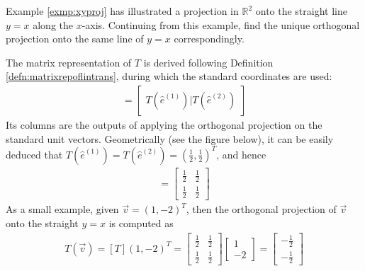 \begin{exmp}
Example \ref{exmp:xyproj} has illustrated a projection in $\mathbb{R}^2$ onto the straight line $y = x$ along the $x$-axis. Continuing from this example, find the unique orthogonal projection onto the same line of $y = x$ correspondingly.
\end{exmp}
\begin{solution}
The matrix representation of $T$ is derived following Definition \ref{defn:matrixrepoflintrans}, during which the standard coordinates are used:
\begin{align*}
[T] =
\begin{bmatrix}
T(\hat{e}^{(1)})|T(\hat{e}^{(2)})
\end{bmatrix}
\end{align*}
Its columns are the outputs of applying the orthogonal projection on the standard unit vectors. Geometrically (see the figure below), it can be easily deduced that $T(\hat{e}^{(1)}) = T(\hat{e}^{(2)}) = (\frac{1}{2}, \frac{1}{2})^T$, and hence
\begin{align*}
[T] =
\begin{bmatrix}
\frac{1}{2} & \frac{1}{2} \\
\frac{1}{2} & \frac{1}{2} 
\end{bmatrix}
\end{align*}
As a small example, given $\vec{v}=(1,-2)^T$, then the orthogonal projection of $\vec{v}$ onto the straight $y=x$ is computed as
\begin{align*}
T(\vec{v}) = [T](1,-2)^T = 
\begin{bmatrix}
\frac{1}{2} & \frac{1}{2} \\
\frac{1}{2} & \frac{1}{2}     
\end{bmatrix}
\begin{bmatrix}
1 \\
-2
\end{bmatrix}
=
\begin{bmatrix}
-\frac{1}{2} \\
-\frac{1}{2}
\end{bmatrix}
\end{align*}
\par {}
\end{solution}
